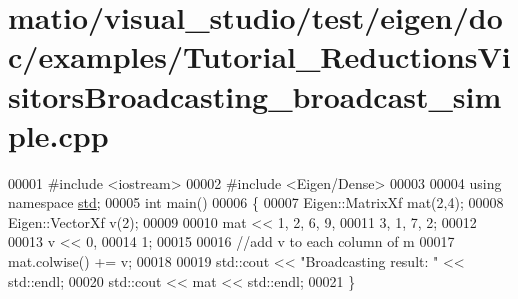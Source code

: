 \hypertarget{matio_2visual__studio_2test_2eigen_2doc_2examples_2_tutorial___reductions_visitors_broadcasting__broadcast__simple_8cpp_source}{}\section{matio/visual\+\_\+studio/test/eigen/doc/examples/\+Tutorial\+\_\+\+Reductions\+Visitors\+Broadcasting\+\_\+broadcast\+\_\+simple.cpp}
\label{matio_2visual__studio_2test_2eigen_2doc_2examples_2_tutorial___reductions_visitors_broadcasting__broadcast__simple_8cpp_source}

\begin{DoxyCode}
00001 \textcolor{preprocessor}{#include <iostream>}
00002 \textcolor{preprocessor}{#include <Eigen/Dense>}
00003 
00004 \textcolor{keyword}{using namespace }\hyperlink{namespacestd}{std};
00005 \textcolor{keywordtype}{int} main()
00006 \{
00007   Eigen::MatrixXf mat(2,4);
00008   Eigen::VectorXf v(2);
00009   
00010   mat << 1, 2, 6, 9,
00011          3, 1, 7, 2;
00012          
00013   v << 0,
00014        1;
00015        
00016   \textcolor{comment}{//add v to each column of m}
00017   mat.colwise() += v;
00018   
00019   std::cout << \textcolor{stringliteral}{"Broadcasting result: "} << std::endl;
00020   std::cout << mat << std::endl;
00021 \}
\end{DoxyCode}
